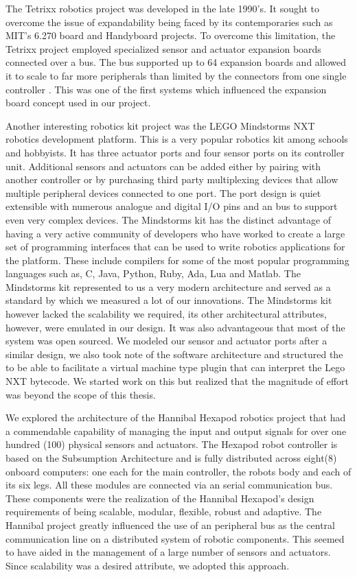 The Tetrixx robotics project was developed in the late 1990's. It sought to overcome the issue of expandability being faced by its contemporaries such as MIT's 6.270 board and Handyboard projects. To overcome this limitation, the Tetrixx project employed specialized sensor and actuator expansion boards connected over a bus. The bus supported up to 64 expansion boards and allowed it to scale to far more peripherals than limited by the connectors from one single controller \parencite{tetrixx}. This was one of the first systems which influenced the expansion board concept used in our project.

Another interesting robotics kit project was the LEGO Mindstorms NXT robotics development platform. This is a very popular robotics kit among schools and hobbyists. It has three actuator ports and four sensor ports on its controller unit. Additional sensors and actuators can be added either by pairing with another controller or by purchasing third party multiplexing devices that allow multiple peripheral devices connected to one port. The port design is quiet extensible with numerous analogue and digital I/O pins and an \iic bus to support even very complex devices. The Mindstorms kit has the distinct advantage of having a very active community of developers who have worked to create a large set of programming interfaces that can be used to write robotics applications for the platform. These include compilers for some of the most popular programming languages such as, C, Java, Python, Ruby, Ada, Lua and Matlab. The Mindstorms kit represented to us a very modern architecture and served as a standard by which we measured a lot of our innovations. The Mindstorms kit however lacked the scalability we required, its other architectural attributes, however, were emulated in our design. It was also advantageous that most of the system was open sourced. We modeled our sensor and actuator ports after a similar design, we also took note of the software architecture and structured the \xten to be able to facilitate a virtual machine type plugin that can interpret the Lego NXT bytecode. We started work on this but realized that the magnitude of effort was beyond the scope of this thesis.

We explored the architecture of the Hannibal Hexapod robotics project that had a commendable capability of managing the input and output signals for over one hundred (100) physical sensors and actuators. The Hexapod robot controller is based on the Subsumption Architecture and is fully distributed across eight(8) onboard computers: one each for the main controller, the robots body and each of its six legs. All these modules are connected via an \iic serial communication bus. These components were the realization of the Hannibal Hexapod's design requirements of being scalable, modular, flexible, robust and adaptive. The Hannibal project greatly influenced the use of an \iic peripheral bus as the central communication line on a distributed system of robotic components. This seemed to have aided in the management of a large number of sensors and actuators. Since scalability was a desired attribute, we adopted this approach.

